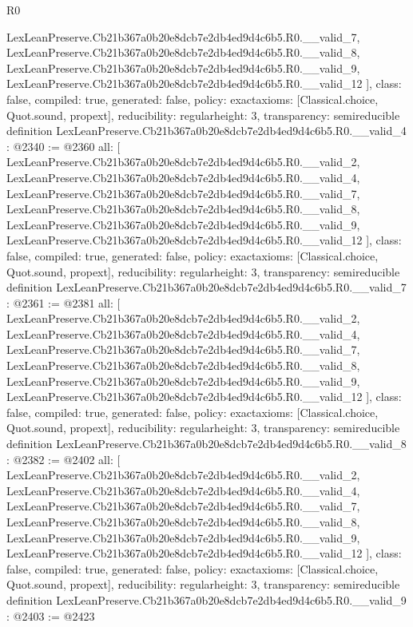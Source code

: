 \begin{lexlean}{R0}
\begin{coremodule}
{    LexLeanPreserve.Cb21b367a0b20e8dcb7e2db4ed9d4c6b5.R0.__valid_7,
    LexLeanPreserve.Cb21b367a0b20e8dcb7e2db4ed9d4c6b5.R0.__valid_8,
    LexLeanPreserve.Cb21b367a0b20e8dcb7e2db4ed9d4c6b5.R0.__valid_9,
    LexLeanPreserve.Cb21b367a0b20e8dcb7e2db4ed9d4c6b5.R0.__valid_12
  ],
  class: false,
  compiled: true,
  generated: false,
  policy: exact{axioms: [Classical.choice, Quot.sound, propext]},
  reducibility: regular{height: 3},
  transparency: semireducible
}
definition LexLeanPreserve.Cb21b367a0b20e8dcb7e2db4ed9d4c6b5.R0.__valid_4 : @2340 := @2360 {
  all: [
    LexLeanPreserve.Cb21b367a0b20e8dcb7e2db4ed9d4c6b5.R0.__valid_2,
    LexLeanPreserve.Cb21b367a0b20e8dcb7e2db4ed9d4c6b5.R0.__valid_4,
    LexLeanPreserve.Cb21b367a0b20e8dcb7e2db4ed9d4c6b5.R0.__valid_7,
    LexLeanPreserve.Cb21b367a0b20e8dcb7e2db4ed9d4c6b5.R0.__valid_8,
    LexLeanPreserve.Cb21b367a0b20e8dcb7e2db4ed9d4c6b5.R0.__valid_9,
    LexLeanPreserve.Cb21b367a0b20e8dcb7e2db4ed9d4c6b5.R0.__valid_12
  ],
  class: false,
  compiled: true,
  generated: false,
  policy: exact{axioms: [Classical.choice, Quot.sound, propext]},
  reducibility: regular{height: 3},
  transparency: semireducible
}
definition LexLeanPreserve.Cb21b367a0b20e8dcb7e2db4ed9d4c6b5.R0.__valid_7 : @2361 := @2381 {
  all: [
    LexLeanPreserve.Cb21b367a0b20e8dcb7e2db4ed9d4c6b5.R0.__valid_2,
    LexLeanPreserve.Cb21b367a0b20e8dcb7e2db4ed9d4c6b5.R0.__valid_4,
    LexLeanPreserve.Cb21b367a0b20e8dcb7e2db4ed9d4c6b5.R0.__valid_7,
    LexLeanPreserve.Cb21b367a0b20e8dcb7e2db4ed9d4c6b5.R0.__valid_8,
    LexLeanPreserve.Cb21b367a0b20e8dcb7e2db4ed9d4c6b5.R0.__valid_9,
    LexLeanPreserve.Cb21b367a0b20e8dcb7e2db4ed9d4c6b5.R0.__valid_12
  ],
  class: false,
  compiled: true,
  generated: false,
  policy: exact{axioms: [Classical.choice, Quot.sound, propext]},
  reducibility: regular{height: 3},
  transparency: semireducible
}
definition LexLeanPreserve.Cb21b367a0b20e8dcb7e2db4ed9d4c6b5.R0.__valid_8 : @2382 := @2402 {
  all: [
    LexLeanPreserve.Cb21b367a0b20e8dcb7e2db4ed9d4c6b5.R0.__valid_2,
    LexLeanPreserve.Cb21b367a0b20e8dcb7e2db4ed9d4c6b5.R0.__valid_4,
    LexLeanPreserve.Cb21b367a0b20e8dcb7e2db4ed9d4c6b5.R0.__valid_7,
    LexLeanPreserve.Cb21b367a0b20e8dcb7e2db4ed9d4c6b5.R0.__valid_8,
    LexLeanPreserve.Cb21b367a0b20e8dcb7e2db4ed9d4c6b5.R0.__valid_9,
    LexLeanPreserve.Cb21b367a0b20e8dcb7e2db4ed9d4c6b5.R0.__valid_12
  ],
  class: false,
  compiled: true,
  generated: false,
  policy: exact{axioms: [Classical.choice, Quot.sound, propext]},
  reducibility: regular{height: 3},
  transparency: semireducible
}
definition LexLeanPreserve.Cb21b367a0b20e8dcb7e2db4ed9d4c6b5.R0.__valid_9 : @2403 := @2423 {
}
\end{coremodule}
\end{lexlean}
